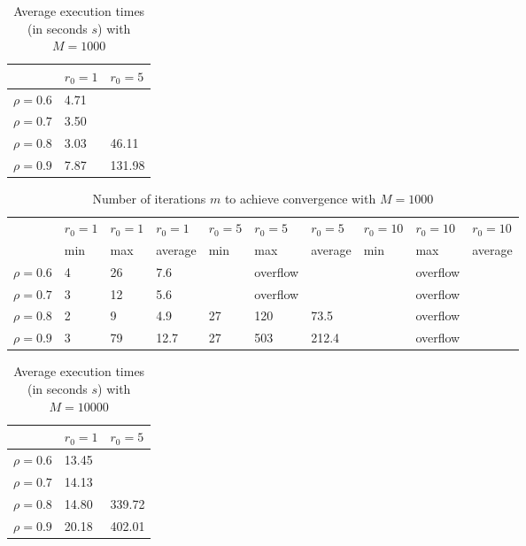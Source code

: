 \documentclass[a4paper,11pt,openright]{report}
\begin{document}
\begin{table}[H]
\centering
\addtolength{\leftskip}{-1.5cm}
\addtolength{\rightskip}{-1.5cm}
\begin{tabular}{|c|ll|}
\hline
$ $ & $r_0 = 1$ & $r_0 = 5$ \\
\hline
$\rho = 0.6$ & 4.71 & \\

$\rho = 0.7$ & 3.50 & \\

$\rho = 0.8$ & 3.03 & 46.11\\

$\rho = 0.9$ & 7.87 & 131.98\\
\hline
\end{tabular}
\caption{Average execution
 times (in seconds $s$) with $M = 1000$}
\end{table}
\begin{table}[H]
\centering
\addtolength{\leftskip}{-1.5cm}
\addtolength{\rightskip}{-1.5cm}
\begin{tabular}{|c|lllllllll|}
\hline
$ $ & $r_0 = 1$ & $r_0 = 1$ & $r_0 = 1$ & $r_0 = 5$ & $r_0 = 5$ & $r_0 = 5$ & $r_0 = 10$ & $r_0 = 10$ & $r_0 = 10$  \\
$ $ & min & max & average & min & max & average & min & max & average \\ 
\hline
$\rho = 0.6$ & 4 & 26 & 7.6 &  & overflow &  &  & overflow &  \\

$\rho = 0.7$ & 3 & 12 & 5.6 &  & overflow &  &  & overflow &  \\

$\rho = 0.8$ & 2 & 9 & 4.9 & 27 & 120 & 73.5 &  & overflow &  \\

$\rho = 0.9$ & 3 & 79 & 12.7 & 27 & 503 & 212.4 &  & overflow &  \\
\hline
\end{tabular}
\caption{Number of iterations $m$ to achieve convergence with $M = 1000$}
\end{table}
\begin{table}[H]
\centering
\addtolength{\leftskip}{-1.5cm}
\addtolength{\rightskip}{-1.5cm}
\begin{tabular}{|c|ll|}
\hline
$ $ & $r_0 = 1$ & $r_0 = 5$  \\
\hline
$\rho = 0.6$ & 13.45 & \\

$\rho = 0.7$ & 14.13 & \\

$\rho = 0.8$ & 14.80 & 339.72\\

$\rho = 0.9$ & 20.18 & 402.01\\
\hline
\end{tabular}
\caption{Average execution
 times (in seconds $s$) with $M = 10000$}
\end{table}
\end{document}

